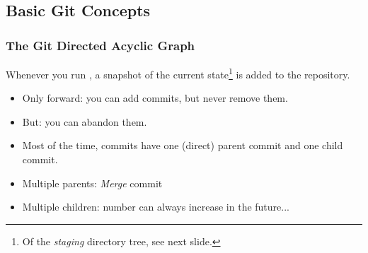 \subsection{Basic Git Concepts}


\begin{frame}
  \frametitle{The Git Directed Acyclic Graph}

  Whenever you run , a snapshot of the current
  state\footnote{Of the \emph{staging} directory tree, see next
    slide.} is added to the repository.
  \begin{itemize}
  \item Only forward: you can add commits, but never remove them.
  \item But: you can abandon them.
  \item Most of the time, commits have one (direct) parent commit and
    one child commit.
  \item Multiple parents: \emph{Merge} commit
  \item Multiple children: number can always increase in the future...
  \end{itemize}
\end{frame}


{
  \begin{frame}[plain]
  \end{frame}
}


